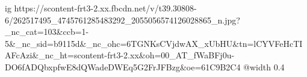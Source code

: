  
 
 
 
 

\ifcmt
  ig https://scontent-frt3-2.xx.fbcdn.net/v/t39.30808-6/262517495_4745761285483292_2055056574126028865_n.jpg?_nc_cat=103&ccb=1-5&_nc_sid=b9115d&_nc_ohc=6TGNKsCVjdwAX_xUbHU&tn=lCYVFeHcTIAFcAzi&_nc_ht=scontent-frt3-2.xx&oh=00_AT_fWaBFj0u-DO6fADQbxpfwE8dQWadeDWEq5G2FrJFBzg&oe=61C9B2C4
  @width 0.4
\fi
